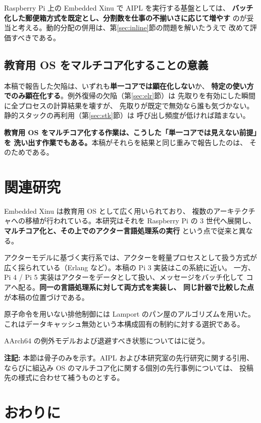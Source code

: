 \documentclass[a4paper,11pt]{ltjsarticle}
\begin{document}
Raspberry Pi 上の Embedded Xinu で AIPL を実行する基盤としては、
\textbf{バッチ化した郵便箱方式を既定とし、分割数を仕事の不揃いさに応じて増やす}
のが妥当と考える。動的分配の併用は、第\ref{sec:inline}節の問題を解いたうえで
改めて評価すべきである。

\subsection{教育用 OS をマルチコア化することの意義}
本稿で報告した欠陥は、いずれも\textbf{単一コアでは顕在化しない}か、
\textbf{特定の使い方でのみ顕在化する}。例外復帰の欠陥（第\ref{sec:elr}節）は
先取りを有効にした瞬間に全プロセスの計算結果を壊すが、
先取りが既定で無効なら誰も気づかない。静的スタックの再利用（第\ref{sec:stk}節）は
呼び出し頻度が低ければ踏まない。

\textbf{教育用 OS をマルチコア化する作業は、こうした「単一コアでは見えない前提」を
洗い出す作業でもある。}本稿がそれらを結果と同じ重みで報告したのは、
そのためである。

\section{関連研究}\label{sec:related}

Embedded Xinu\cite{comer,embxinu} は教育用 OS として広く用いられており、
複数のアーキテクチャへの移植が行われている。本研究はそれを Raspberry Pi の
3 世代へ展開し、\textbf{マルチコア化と、その上でのアクター言語処理系の実行}
という点で従来と異なる。

アクターモデル\cite{agha}に基づく実行系では、アクターを軽量プロセスとして扱う方式が
広く採られている（Erlang\cite{erlang} など）。本稿の Pi 3 実装はこの系統に近い。
一方、Pi 4 / Pi 5 実装はアクターをデータとして扱い、メッセージをバッチ化して
コアへ配る。\textbf{同一の言語処理系に対して両方式を実装し、
同じ計器で比較した点}が本稿の位置づけである。

原子命令を用いない排他制御には Lamport のパン屋のアルゴリズム\cite{bakery}を用いた。
これはデータキャッシュ無効という本構成固有の制約に対する選択である。

AArch64 の例外モデルおよび退避すべき状態については\cite{armarm}に従う。

\medskip
\noindent
\textbf{注記:} 本節は骨子のみを示す。AIPL および本研究室の先行研究に関する引用、
ならびに組込み OS のマルチコア化に関する個別の先行事例については、
投稿先の様式に合わせて補うものとする。

\section{おわりに}
\end{document}
